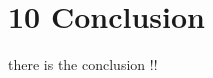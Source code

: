 \chapter*{10    Conclusion}
\setcounter{chapter}{10}
\setcounter{section}{0}

there is the conclusion !!